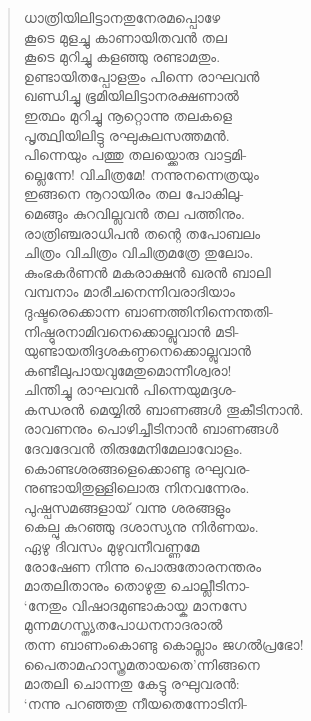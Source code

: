 \begin{verse}
ധാത്രിയിലിട്ടാനതുനേരമപ്പൊഴേ\\
കൂടെ മുളച്ചു കാണായിതവന്‍ തല\\
കൂടെ മുറിച്ചു കളഞ്ഞു രണ്ടാമതും.\\
ഉണ്ടായിതപ്പോളതും പിന്നെ രാഘവന്‍\\
ഖണ്ഡിച്ചു ഭൂമിയിലിട്ടാനരക്ഷണാല്‍\\
ഇത്ഥം മുറിച്ചു നൂറ്റൊന്നു തലകളെ\\
പൃത്ഥ്വിയിലിട്ടു രഘുകുലസത്തമന്‍.\\
പിന്നെയും പത്തു തലയ്ക്കൊരു വാട്ടമി-\\
ല്ലെന്നേ! വിചിത്രമേ! നന്നുനന്നെത്രയും\\
ഇങ്ങനെ നൂറായിരം തല പോകിലു-\\
മെങ്ങും കുറവില്ലവന്‍ തല പത്തിനും.\\
രാത്രിഞ്ചരാധിപന്‍ തന്റെ തപോബലം\\
ചിത്രം വിചിത്രം വിചിത്രമത്രേ തുലോം.\\
കുംഭകര്‍ണന്‍ മകരാക്ഷന്‍ ഖരന്‍ ബാലി\\
വമ്പനാം മാരീചനെന്നിവരാദിയാം\\
ദുഷ്ടരെക്കൊന്ന ബാണത്തിനിന്നെന്തതി-\\
നിഷ്ഠുരനാമിവനെക്കൊല്ലുവാന്‍ മടി-\\
യുണ്ടായതിദ്ദശകണ്ഠനെക്കൊല്ലുവാന്‍\\
കണ്ടീലുപായവുമേതുമൊന്നീശ്വരാ!\\
ചിന്തിച്ചു രാഘവന്‍ പിന്നെയുമദ്ദശ-\\
കന്ധരന്‍ മെയ്യില്‍ ബാണങ്ങള്‍ തൂകീടിനാന്‍.\\
രാവണനും പൊഴിച്ചീടിനാന്‍ ബാണങ്ങള്‍\\
ദേവദേവന്‍ തിരുമേനിമേലാവോളം.\\
കൊണ്ടശരങ്ങളെക്കൊണ്ടു രഘുവര-\\
നുണ്ടായിതുള്ളിലൊരു നിനവന്നേരം.\\
പുഷ്പസമങ്ങളായ് വന്നു ശരങ്ങളും\\
കെല്പു കുറഞ്ഞു ദശാസ്യനു നിര്‍ണയം.\\
ഏഴു ദിവസം മുഴുവനീവണ്ണമേ\\
രോഷേണ നിന്നു പൊരുതോരനന്തരം\\
മാതലിതാനും തൊഴുതു ചൊല്ലീടിനാ-\\
‘നേതും വിഷാദമുണ്ടാകായ്ക മാനസേ\\
മുന്നമഗസ്ത്യതപോധനനാദരാല്‍\\
തന്ന ബാണംകൊണ്ടു കൊല്ലാം ജഗല്‍പ്രഭോ!\\
പൈതാമഹാസ്ത്രമതായതെ’ന്നിങ്ങനെ\\
മാതലി ചൊന്നതു കേട്ടു  രഘുവരന്‍:\\
‘നന്നു പറഞ്ഞതു നീയതെന്നോടിനി-\\

\end{verse}
